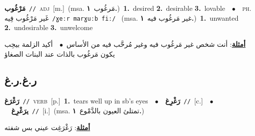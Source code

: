 \documentclass[10pt,a4paper,twoside]{article} %
\begin{document}
\begin{multicols}{2}
{\setlength\topsep{0pt}\textbf{\foreignlanguage{arabic}{مَرْغُوب}}\ {\color{gray}\texttt{//}\color{black}}\ \textsc{adj}\ [m.]\ \color{gray}(msa. \foreignlanguage{arabic}{مَرغُوب}~\foreignlanguage{arabic}{\textbf{١.}})\color{black}\ \textbf{1.}~desired  \textbf{2.}~desirable  \textbf{3.}~lovable\ \ $\bullet$\ \ \textsc{ph.} \color{gray} \foreignlanguage{arabic}{غَير مَرْغُوب فِيه}\color{black}\ {\color{gray}\texttt{/{\sffamily ɣeːr marɣuːb fiː}/}\color{black}}\ \color{gray} (msa. \foreignlanguage{arabic}{غير مَرغُوب فيه}~\foreignlanguage{arabic}{\textbf{١.}})\color{black}\ \textbf{1.}~unwanted  \textbf{2.}~undesirable  \textbf{3.}~unwelcome\  \begin{flushright}\color{gray}\foreignlanguage{arabic}{\textbf{\underline{\foreignlanguage{arabic}{أمثلة}}}: أنت شخص غير مَرغُوب فيه وغير مُرحَّب فيه من الأساس\ $\bullet$\ \  أكيد الزلمة بيحِب يكون مَرغُوب بالذات عند البنات الصغاؤ}\end{flushright}\color{black}} \vspace{2mm}

\vspace{-3mm}
\subsection*{\color{blue}\foreignlanguage{arabic}{ر.غ.ر.غ}\color{blue}{}} 

{\setlength\topsep{0pt}\textbf{\foreignlanguage{arabic}{رَغْرَغ}}\ {\color{gray}\texttt{//}\color{black}}\ \textsc{verb}\ [p.]\ \textbf{1.}~tears well up in sb's eyes\ \ $\bullet$\ \ \setlength\topsep{0pt}\textbf{\foreignlanguage{arabic}{رَغْرِغ}}\ {\color{gray}\texttt{//}\color{black}}\ [c.]\ \ $\bullet$\ \ \setlength\topsep{0pt}\textbf{\foreignlanguage{arabic}{يرَغْرِغ}}\ {\color{gray}\texttt{//}\color{black}}\ [i.]\ \color{gray}(msa. \foreignlanguage{arabic}{تمتلئ العيون بالدَّمْوع}~\foreignlanguage{arabic}{\textbf{١.}})\color{black}\  \begin{flushright}\color{gray}\foreignlanguage{arabic}{\textbf{\underline{\foreignlanguage{arabic}{أمثلة}}}: رَغْرَغِت عيني بس شفته}\end{flushright}\color{black}} \vspace{2mm}


\end{multicols}
\end{document}
